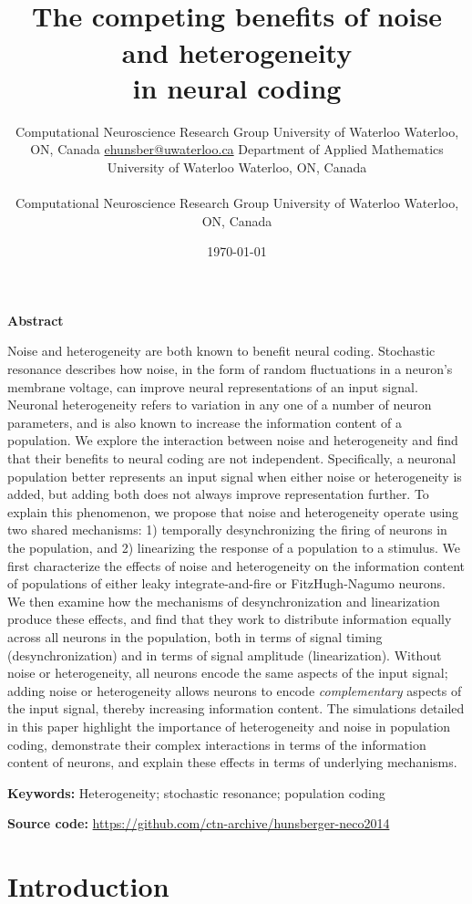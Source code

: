 \documentclass[letterpaper,11pt]{article}
\title{
  \vspace{-0.5in}
  \horrule{3pt} \\[0.4cm]
  \bf The competing benefits of noise and heterogeneity\\in neural coding
  \horrule{1pt}
}
\author{
  \hspace{-1em}
  \makeauthor{Eric Hunsberger}
             {Computational Neuroscience Research Group}
             {University of Waterloo}
             {Waterloo, ON, Canada}
             {\url{ehunsber@uwaterloo.ca}}
  \makeauthor{Matthew Scott}
             {Department of Applied Mathematics}
             {University of Waterloo}
             {Waterloo, ON, Canada}
             {\relax} \\ \\
  \hspace{-1em}
  \makeauthor{Chris Eliasmith}
             {Computational Neuroscience Research Group}
             {University of Waterloo}
             {Waterloo, ON, Canada}
             {}
}
\date{\today}
\begin{document}
\maketitle

\begin{center} {\bf Abstract} \end{center}

Noise and heterogeneity are both known to benefit neural coding.
Stochastic resonance describes how noise,
in the form of random fluctuations in a neuron's membrane voltage,
can improve neural representations of an input signal.
Neuronal heterogeneity refers to variation in any one of a number of neuron parameters,
and is also known to increase the information content of a population.
We explore the interaction between noise and heterogeneity
and find that their benefits to neural coding are not independent.
Specifically, a neuronal population better represents an input signal
when either noise or heterogeneity is added,
but adding both does not always improve representation further.
To explain this phenomenon, we propose
that noise and heterogeneity operate using two shared mechanisms:
1) temporally desynchronizing the firing of neurons in the population,
and 2) linearizing the response of a population to a stimulus.
We first characterize the effects of noise and heterogeneity
on the information content of populations of
either leaky integrate-and-fire or FitzHugh-Nagumo neurons.
We then examine how the mechanisms
of desynchronization and linearization produce these effects,
and find that they work to distribute information equally across all neurons in the population,
both in terms of signal timing (desynchronization) and in terms of signal amplitude (linearization).
Without noise or heterogeneity,
all neurons encode the same aspects of the input signal;
adding noise or heterogeneity allows neurons
to encode \emph{complementary} aspects of the input signal,
thereby increasing information content.
The simulations detailed in this paper
highlight the importance of heterogeneity and noise in population coding,
demonstrate their complex interactions in terms of the information content of neurons,
and explain these effects in terms of underlying mechanisms.

{\bf Keywords:} Heterogeneity; stochastic resonance; population coding

{\bf Source code:} \url{https://github.com/ctn-archive/hunsberger-neco2014}


\section{Introduction}
\label{scn:introduction}
\end{document}
